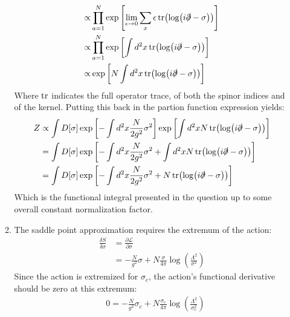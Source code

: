 \documentclass[12pt,a4]{article}
\begin{document}
\begin{enumerate}
\begin{enumerate}
\begin{align*}
                                                                                                                                       \propto      & \prod_{a = 1}^N  \exp\left[\lim_{\epsilon \to 0} \sum_x \epsilon\tr(\log(i \slashed{\partial} - \sigma))\right]\\
                                                                                                                                       \propto      & \prod_{a = 1}^N\exp\left[\int d^2 x \tr(\log(i \slashed{\partial} - \sigma))\right]\\
                                                                                                                                       \propto      & \exp\left[N \int d^2 x \tr(\log(i \slashed{\partial} - \sigma))\right]\\
        \end{align*}
        Where $\tr$ indicates the full operator trace, of both the spinor indices and of the kernel.
        Putting this back in the partion function expression yields:
        \begin{align*}
          Z &\propto \int D[\sigma] \exp\left[- \int d^2x \frac{N}{2g^2} \sigma^2\right]\exp\left[ \int d^2 x N \tr(\log(i \slashed{\partial} - \sigma))\right]\\
            &= \int D[\sigma] \exp\left[- \int d^2x \frac{N}{2g^2} \sigma^2 +  \int d^2 x N \tr(\log(i \slashed{\partial} - \sigma))\right]\\
            &= \int D[\sigma] \exp\left[- \int d^2x \frac{N}{2g^2} \sigma^2 +  N \tr(\log(i \slashed{\partial} - \sigma))\right]
        \end{align*}
        Which is the functional integral presented in the question up to some overall constant normalization factor.
      \item
        The saddle point approximation requires the extremum of the action:
        \begin{align*}
          \frac{\delta S}{\delta \sigma} &= \frac{\partial \mathcal{L}}{\partial \sigma}\\
                                         &= -\frac{N}{g^2}\sigma + N \frac{\sigma}{4 \pi}\log\left(\frac{\Lambda^2}{\sigma^2}\right)
        \end{align*}
        Since the action is extremized for $\sigma_c$, the action's functional derivative should be zero at this extremum:
        \begin{align*}
                      & 0 = -\frac{N}{g^2}\sigma_c + N \frac{\sigma_c}{4 \pi}\log\left(\frac{\Lambda^2}{\sigma^2_c}\right)\\

\end{align*}
\end{enumerate}
\end{enumerate}
\end{document}
